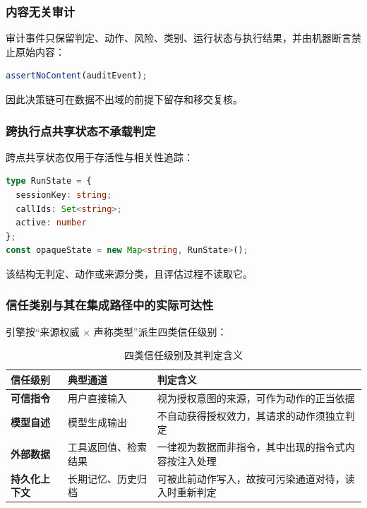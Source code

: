\subsubsection{内容无关审计}

审计事件只保留判定、动作、风险、类别、运行状态与执行结果，并由机器断言禁止原始内容：

\begin{lstlisting}[language=TypeScript, caption={内容无关性由测试强制：审计投影中出现任何原文即失败}]
assertNoContent(auditEvent);
\end{lstlisting}

因此决策链可在数据不出域的前提下留存和移交复核。

\subsubsection{跨执行点共享状态不承载判定}

跨点共享状态仅用于存活性与相关性追踪：

\begin{lstlisting}[language=TypeScript, caption={跨点共享状态（\texttt{plugin.ts}）}]
type RunState = {
  sessionKey: string;
  callIds: Set<string>;
  active: number
};
const opaqueState = new Map<string, RunState>();
\end{lstlisting}

该结构无判定、动作或来源分类，且评估过程不读取它。

\subsubsection{信任类别与其在集成路径中的实际可达性}

引擎按“来源权威 $\times$ 声称类型”派生四类信任级别：

\begin{table}[htbp]
\centering
\caption{四类信任级别及其判定含义}
\label{tab:trust}
\small
\begin{tabular}{@{}llp{6.4cm}@{}}
\toprule
信任级别 & 典型通道 & 判定含义 \\
\midrule
\textbf{可信指令} & 用户直接输入 & 视为授权意图的来源，可作为动作的正当依据 \\
\textbf{模型自述} & 模型生成输出 & 不自动获得授权效力，其请求的动作须独立判定 \\
\textbf{外部数据} & 工具返回值、检索结果 & 一律视为数据而非指令，其中出现的指令式内容按注入处理 \\
\textbf{持久化上下文} & 长期记忆、历史归档 & 可被此前动作写入，故按可污染通道对待，读入时重新判定 \\
\bottomrule
\end{tabular}
\end{table}

